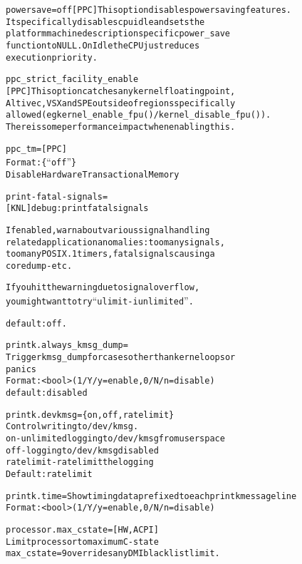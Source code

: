 \documentclass[a4paper,8pt,english]{sphinxmanual}
\begin{document}
\begin{alltt}
        powersave=off   {[}PPC{]} This option disables power saving features.
                        It specifically disables cpuidle and sets the
                        platform machine description specific power\_save
                        function to NULL. On Idle the CPU just reduces
                        execution priority.

        ppc\_strict\_facility\_enable
                        {[}PPC{]} This option catches any kernel floating point,
                        Altivec, VSX and SPE outside of regions specifically
                        allowed (eg kernel\_enable\_fpu()/kernel\_disable\_fpu()).
                        There is some performance impact when enabling this.

        ppc\_tm=         {[}PPC{]}
                        Format: \{``off''\}
                        Disable Hardware Transactional Memory

        print-fatal-signals=
                        {[}KNL{]} debug: print fatal signals

                        If enabled, warn about various signal handling
                        related application anomalies: too many signals,
                        too many POSIX.1 timers, fatal signals causing a
                        coredump - etc.

                        If you hit the warning due to signal overflow,
                        you might want to try ``ulimit -i unlimited''.

                        default: off.

        printk.always\_kmsg\_dump=
                        Trigger kmsg\_dump for cases other than kernel oops or
                        panics
                        Format: \textless{}bool\textgreater{}  (1/Y/y=enable, 0/N/n=disable)
                        default: disabled

        printk.devkmsg=\{on,off,ratelimit\}
                        Control writing to /dev/kmsg.
                        on - unlimited logging to /dev/kmsg from userspace
                        off - logging to /dev/kmsg disabled
                        ratelimit - ratelimit the logging
                        Default: ratelimit

        printk.time=    Show timing data prefixed to each printk message line
                        Format: \textless{}bool\textgreater{}  (1/Y/y=enable, 0/N/n=disable)

        processor.max\_cstate=   {[}HW,ACPI{]}
                        Limit processor to maximum C-state
                        max\_cstate=9 overrides any DMI blacklist limit.


\end{alltt}
\end{document}
